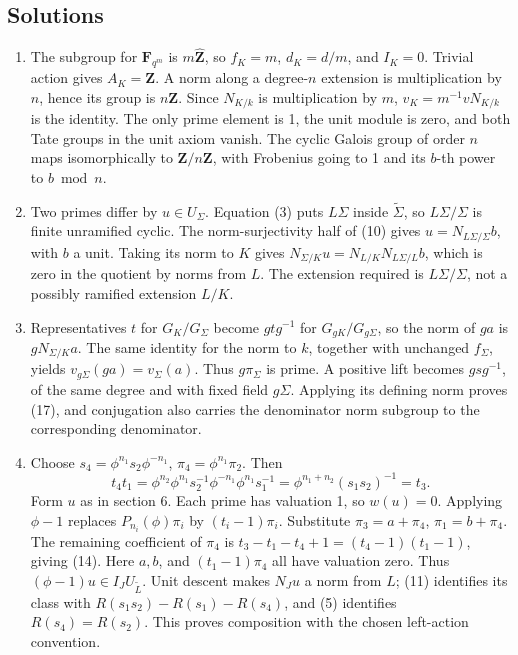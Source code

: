 \documentclass[11pt,a4paper]{article}
\newcommand{\tightlist}{\setlength{\itemsep}{0pt}\setlength{\parskip}{0pt}}
\begin{document}
\subsection{Solutions}\label{solutions}

\begin{enumerate}
\def\labelenumi{\arabic{enumi}.}
\tightlist
\item
  The subgroup for \(\mathbf F_{q^m}\) is \(m\widehat{\mathbf Z}\), so
  \(f_K=m\), \(d_K=d/m\), and \(I_K=0\). Trivial action gives
  \(A_K=\mathbf Z\). A norm along a degree-\(n\) extension is
  multiplication by \(n\), hence its group is \(n\mathbf Z\). Since
  \(N_{K/k}\) is multiplication by \(m\), \(v_K=m^{-1}vN_{K/k}\) is the
  identity. The only prime element is 1, the unit module is zero, and
  both Tate groups in the unit axiom vanish. The cyclic Galois group of
  order \(n\) maps isomorphically to \(\mathbf Z/n\mathbf Z\), with
  Frobenius going to 1 and its \(b\)-th power to \(b\bmod n\).
\item
  Two primes differ by \(u\in U_\Sigma\). Equation (3) puts \(L\Sigma\)
  inside \(\widetilde\Sigma\), so \(L\Sigma/\Sigma\) is finite
  unramified cyclic. The norm-surjectivity half of (10) gives
  \(u=N_{L\Sigma/\Sigma}b\), with \(b\) a unit. Taking its norm to \(K\)
  gives \(N_{\Sigma/K}u=N_{L/K}N_{L\Sigma/L}b\), which is zero in the
  quotient by norms from \(L\). The extension required is
  \(L\Sigma/\Sigma\), not a possibly ramified extension \(L/K\).
\item
  Representatives \(t\) for \(G_K/G_\Sigma\) become \(gtg^{-1}\) for
  \(G_{gK}/G_{g\Sigma}\), so the norm of \(ga\) is \(gN_{\Sigma/K}a\).
  The same identity for the norm to \(k\), together with unchanged
  \(f_\Sigma\), yields \(v_{g\Sigma}(ga)=v_\Sigma(a)\). Thus
  \(g\pi_\Sigma\) is prime. A positive lift becomes \(gsg^{-1}\), of the
  same degree and with fixed field \(g\Sigma\). Applying its defining
  norm proves (17), and conjugation also carries the denominator norm
  subgroup to the corresponding denominator.
\item
  Choose \(s_4=\phi^{n_1}s_2\phi^{-n_1}\), \(\pi_4=\phi^{n_1}\pi_2\).
  Then \[
  t_4t_1
  =\phi^{n_2}\phi^{n_1}s_2^{-1}\phi^{-n_1}
    \phi^{n_1}s_1^{-1}
  =\phi^{n_1+n_2}(s_1s_2)^{-1}=t_3.
  \] Form \(u\) as in section 6. Each prime has valuation 1, so
  \(w(u)=0\). Applying \(\phi-1\) replaces \(P_{n_i}(\phi)\pi_i\) by
  \((t_i-1)\pi_i\). Substitute \(\pi_3=a+\pi_4\), \(\pi_1=b+\pi_4\). The
  remaining coefficient of \(\pi_4\) is
  \(t_3-t_1-t_4+1=(t_4-1)(t_1-1)\), giving (14). Here \(a,b\), and
  \((t_1-1)\pi_4\) all have valuation zero. Thus
  \((\phi-1)u\in I_JU_{\widetilde L}\). Unit descent makes \(N_Ju\) a
  norm from \(L\); (11) identifies its class with
  \(R(s_1s_2)-R(s_1)-R(s_4)\), and (5) identifies \(R(s_4)=R(s_2)\).
  This proves composition with the chosen left-action convention.
\end{enumerate}
\end{document}

